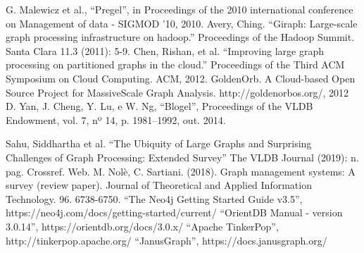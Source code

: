 \documentclass[conference]{IEEEtran}
\begin{document}
\begin{thebibliography}{00}
 G. Malewicz et al., ``Pregel'', in Proceedings of the
    2010 international conference on Management of data - SIGMOD ’10,
        2010.
 Avery, Ching. ``Giraph: Large-scale graph processing
    infrastructure on hadoop.'' Proceedings of the Hadoop Summit. Santa
        Clara 11.3 (2011): 5-9.
 Chen, Rishan, et al. ``Improving large graph processing
    on partitioned graphs in the cloud.'' Proceedings of the Third ACM
        Symposium on Cloud Computing. ACM, 2012.
 GoldenOrb. A Cloud-based Open Source Project for
    MassiveScale Graph Analysis. http://goldenorbos.org/, 2012
 D. Yan, J. Cheng, Y. Lu, e W. Ng, ``Blogel'',
    Proceedings of the VLDB Endowment, vol. 7, nº 14, p. 1981–1992, out.
        2014.

 Sahu, Siddhartha et al. ``The Ubiquity of Large Graphs and Surprising Challenges of Graph Processing: Extended Survey'' The VLDB Journal (2019): n. pag. Crossref. Web.
 M. Nolè, C. Sartiani. (2018). Graph management systems: A survey (review paper). Journal of Theoretical and Applied Information Technology. 96. 6738-6750.
 ``The Neo4j Getting Started Guide v3.5'',
    https://neo4j.com/docs/getting-started/current/
 ``OrientDB Manual - version 3.0.14'',
    https://orientdb.org/docs/3.0.x/
 ``Apache TinkerPop'',
    http://tinkerpop.apache.org/
 ``JanusGraph'',
     https://docs.janusgraph.org/

\end{thebibliography}
\end{document}
